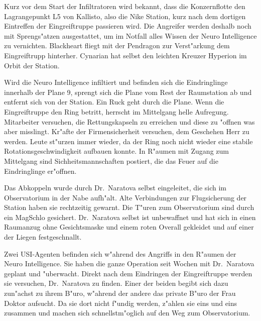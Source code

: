 Kurz vor dem Start der Infiltratoren wird bekannt, dass die Konzernflotte den Lagrangepunkt L5 von Kallisto, also die Nike Station, kurz nach dem dortigen Eintreffen der Eingreiftruppe passieren wird. Die Angreifer werden deshalb noch mit Sprengs"atzen ausgestattet, um im Notfall alles Wissen der Neuro Intelligence zu vernichten. Blackheart fliegt mit der Pendragon zur Verst"arkung dem Eingreiftrupp hinterher. Cynarian hat selbst den leichten Kreuzer Hyperion im Orbit der Station.

Wird die Neuro Intelligence infiltiert und befinden sich die Eindringlinge innerhalb der Plane 9, sprengt sich die Plane vom Rest der Raumstation ab und entfernt sich von der Station. Ein Ruck geht durch die Plane. Wenn die Eingreiftruppe den Ring betritt, herrscht im Mittelgang helle Aufregung. Mitarbeiter versuchen, die Rettungskapseln zu erreichen und diese zu "offnen was aber misslingt. Kr"afte der Firmensicherheit versuchen, dem Geschehen Herr zu werden. Leute st"urzen immer wieder, da der Ring noch nicht wieder eine stabile Rotationsgeschwindigkeit aufbauen konnte. In R"aumen mit Zugang zum Mittelgang sind Sichheitsmannschaften postiert, die das Feuer auf die Eindringlinge er"offnen.

Das Abkoppeln wurde durch Dr.~Naratova selbst eingeleitet, die sich im Observatorium in der Nabe aufh"alt. Alte Verbindungen zur Flugsicherung der Station haben sie rechtzeitig gewarnt. Die T"uren zum Observatorium sind durch ein MagSchlo\3 gesichert. Dr.~Naratova selbst ist unbewaffnet und hat sich in einen Raumanzug ohne Gesichtsmaske und einem roten Overall gekleidet und auf einer der Liegen festgeschnallt.

Zwei USI-Agenten befinden sich w"ahrend des Angriffs in den R"aumen der Neuro Intelligence. Sie haben die ganze Operation seit Wochen mit Dr.~Naratova geplant und "uberwacht. Direkt nach dem Eindringen der Eingreiftruppe werden sie versuchen, Dr.~Naratova zu finden. Einer der beiden begibt sich dazu zun"achst zu ihrem B"uro, w"ahrend der andere das private B"uro der Frau Doktor aufsucht. Da sie dort nicht f"undig werden, z"ahlen sie eins und eins zusammen und machen  sich schnellstm"oglich auf den Weg zum Observatorium.

